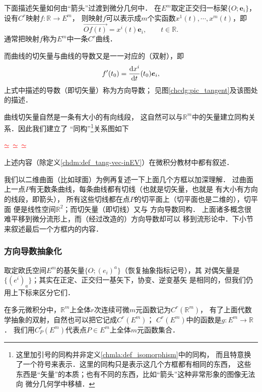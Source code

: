 下面描述矢量如何由“箭头”过渡到微分几何中．
在$E^m$取定正交归一标架$\{O;\boldsymbol{e}_i\}$，设有$C^r$映射$f:\mathbb{R} \to E^m$，
则映射$f$可以表示成$m$个实函数$x^1(t),\cdots, x^m(t)$，即
\begin{equation}
    \overrightarrow{Of(t)} = x^i(t) \boldsymbol{e}_i , \qquad t\in \mathbb{R} .
\end{equation}
通常把映射$f$称为$E^m$中一条$C^r${\kaishu 曲线}．

而曲线的切矢量与曲线的导数又是一一对应的（双射），即
\begin{equation}\label{chdm:eqn_gfv}
    f'(t_0) = \frac{{\rm d} x^i}{{\rm d}t}(t_0)\boldsymbol{e}_i ,
\end{equation}
上式中描述的导数（即切矢量）称为{\kaishu 方向导数}；
见图\ref{chcdg:pic_tangent}及该图处的描述．

曲线切矢量自然是一条有大小的有向线段，
这自然可以与$\mathbb{R}^m$中的矢量建立同构关系．因此我们建立了
“同构”{\footnote{这里加引号的同构并非定义\ref{chmla:def_isomorphism}中的同构，
        而且特意换了一个符号来表示．这里的同构只是表示这几个方框都有相同的东西，
        这些东西是“矢量”的本质；也有不同的东西，比如“箭头”这种非常形象的图像无法向
        微分几何学中移植．}}关系图如下
\begin{center}
     $\color{red}\simeq$
     $\color{red}\simeq$
     $\color{red}\simeq$
\end{center}
上述内容（除定义\ref{chdm:def_tang-vec-inEV}）在微积分教材中都有叙述．

我们以二维曲面（比如球面）为例再复述一下上面几个方框以加深理解．
过曲面上一点$P$有无数条曲线，每条曲线都有切线（也就是切矢量，也就是
有大小有方向的线段，即箭头），
所有这些切线都在点$P$的切平面上（切平面也是二维的），切平面
便是线性空间$\mathbb{R}^2$；而切矢量（即切线）又与
方向导数同构．
上面诸多概念很难平移到微分流形上，而（经过改造的）方向导数却可以
移到流形论中．下小节来叙述最后一个方框内的内容．


\subsubsection{方向导数抽象化}\label{chdm:sec_ed}
取定欧氏空间$E^m$的基矢量$\{O;(e_i)^a\}$（恢复抽象指标记号），其
对偶矢量是$\{(e^i)_a\}$；其实在正定、正交归一基矢下，协变、逆变基矢
是相同的，但我们仍用上下标来区分它们．

在多元微积分中，$\mathbb{R}^m$上全体$r$次连续可微$m$元函数记为$C^r(\mathbb{R}^m)$，
有了上面代数学抽象的双射，自然也可以把它记成$C^r(E^m)$；
$C^r(E^m)$中的函数是$g:E^m \to \mathbb{R}$．
我们用$C^r_P(E^m)$代表点$P\in E^m$上全体$m$元函数集合．

